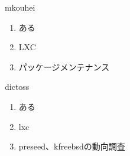 \begin{prework}{ mkouhei }
  \begin{enumerate}
  \item ある
  \item LXC
  \item パッケージメンテナンス
  \end{enumerate}
\end{prework}

\begin{prework}{ dictoss }
  \begin{enumerate}
  \item ある
  \item lxc
  \item preseed、kfreebsdの動向調査
  \end{enumerate}
\end{prework}
